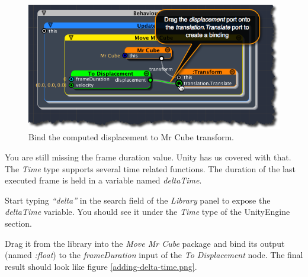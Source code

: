 \begin{figure}[htbp]
\centering
\includegraphics[keepaspectratio,width=\textwidth,height=0.75\textheight]{bind-displacement-to-translation.png}
\caption{Bind the computed displacement to Mr Cube transform.}
\label{bind-displacement-to-translation.png}
\end{figure}

You are still missing the frame duration value. Unity has us covered with that. The \emph{Time} type supports several time related functions. The duration of the last executed frame is held in a variable named \emph{deltaTime}.

Start typing \emph{``delta''} in the search field of the \emph{Library} panel to expose the \emph{deltaTime} variable. You should see it under the \emph{Time} type of the UnityEngine section.

Drag it from the library into the \emph{Move Mr Cube} package and bind its output (named \emph{:float}) to the \emph{frameDuration} input of the \emph{To Displacement} node. The final result should look like figure \ref{adding-delta-time.png}.

